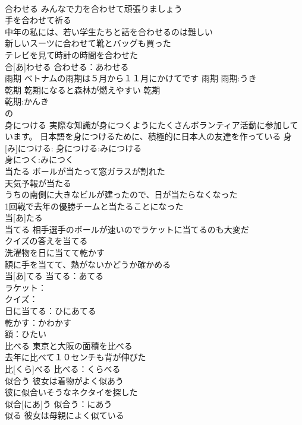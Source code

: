\documentclass[8pt]{extreport}
\begin{document}
\begin{CJK}{UTF8}{min}
\\	合わせる	みんなで力を合わせて頑張りましょう 
\\	手を合わせて祈る 
\\	中年の私には、若い学生たちと話を合わせるのは難しい 
\\	新しいスーツに合わせて靴とバッグも買った 
\\	テレビを見て時計の時間を合わせた 
\\	合[あ]わせる			合わせる：あわせる
\\	雨期	ベトナムの雨期は５月から１１月にかけてです	雨期			雨期:うき
\\	乾期	乾期になると森林が燃えやすい	乾期	
\\	乾期:かんき
\\	の
\\	身につける	実際な知識が身につくようにたくさんボランティア活動に参加しています。 日本語を身につけるために、積極的に日本人の友達を作っている	身[み]につける:			身につける:みにつける
\\	身につく:みにつく
\\	当たる	ボールが当たって窓ガラスが割れた 
\\	天気予報が当たる 
\\	うちの南側に大きなビルが建ったので、日が当たらなくなった 
\\	1回戦で去年の優勝チームと当たることになった 
\\	当[あ]たる						
\\	当てる	相手選手のボールが速いのでラケットに当てるのも大変だ 
\\	クイズの答えを当てる 
\\	洗濯物を日に当てて乾かす 
\\	額に手を当てて、熱がないかどうか確かめる 
\\	当[あ]てる			当てる：あてる
\\	ラケット：
\\	クイズ：
\\	日に当てる：ひにあてる
\\	乾かす：かわかす
\\	額：ひたい
\\	比べる	東京と大阪の面積を比べる 
\\	去年に比べて１０センチも背が伸びた 
\\	比[くら]べる			比べる：くらべる
\\	似合う	彼女は着物がよく似あう 
\\	彼に似合いそうなネクタイを探した 
\\	似合[にあ]う			似合う：にあう
\\	似る	彼女は母親によく似ている 

\end{CJK}
\end{document}
